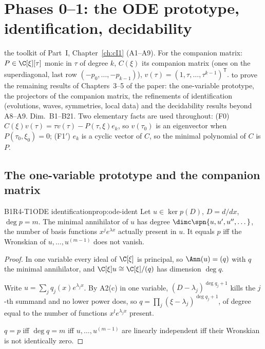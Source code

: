 \chapter{Phases 0--1: the ODE prototype, identification, decidability}\label{ch:cII1}
\chapterbrief
{the toolkit of Part~I, Chapter~\ref{ch:cI1} (A1--A9). For the companion matrix: $P\in\C[\xi][\tau]$ monic in $\tau$ of degree $k$, $C(\xi)$ its companion matrix (ones on the superdiagonal, last row $(-p_0,\dots,-p_{k-1})$), $v(\tau)=(1,\tau,\dots,\tau^{k-1})^{\mathsf T}$.}
{to prove the remaining results of Chapters~3--5 of the paper: the one-variable prototype, the projectors of the companion matrix, the refinements of identification (evolutions, waves, symmetries, local data) and the decidability results beyond A8--A9.}
{Dim.~B1--B21. Two elementary facts are used throughout: (F0) $C(\xi)v(\tau)=\tau v(\tau)-P(\tau,\xi)e_k$, so $v(\tau_0)$ is an eigenvector when $P(\tau_0,\xi_0)=0$; (F1$'$) $e_k$ is a cyclic vector of $C$, so the minimal polynomial of $C$ is $P$.}

\section{The one-variable prototype and the companion matrix}

\begin{dimcard}{B1}{R4-T1}{ODE identification}{\proved}{prop:ode-ident}
Let $u\in\ker p(D)$, $D=d/dx$, $\deg p=m$. The minimal annihilator of $u$ has degree $\dimc\spn\{u,u',u'',\dots\}$, the number of basis functions $x^je^{\lambda x}$ actually present in $u$. It equals $p$ iff the Wronskian of $u,\dots,u^{(m-1)}$ does not vanish.
\end{dimcard}
\begin{proof}
In one variable every ideal of $\C[\xi]$ is principal, so $\Ann(u)=(q)$ with $q$ the minimal annihilator, and $\C[\xi]u\cong\C[\xi]/(q)$ has dimension $\deg q$.

Write $u=\sum_jq_j(x)e^{\lambda_jx}$. By A2(c) in one variable, $(D-\lambda_j)^{\deg q_j+1}$ kills the $j$-th summand and no lower power does, so $q=\prod_j(\xi-\lambda_j)^{\deg q_j+1}$, of degree equal to the number of functions $x^le^{\lambda_jx}$ present.

$q=p$ iff $\deg q=m$ iff $u,\dots,u^{(m-1)}$ are linearly independent iff their Wronskian is not identically zero.
\end{proof}

